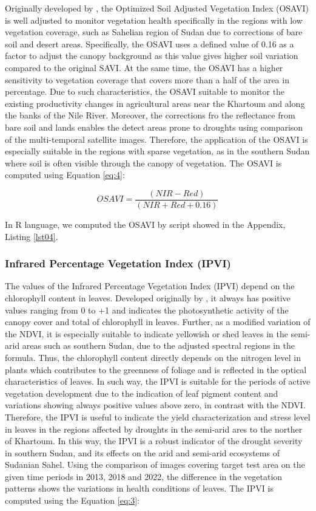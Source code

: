 \documentclass[jimaging,article,submit,pdftex,moreauthors]{Definitions/mdpi}
\begin{document}
Originally developed by \cite{Rondeaux}, the Optimized Soil Adjusted Vegetation Index (OSAVI) is well adjusted to monitor vegetation health specifically in the regions with low vegetation coverage, such as Sahelian region of Sudan due to corrections of bare soil and desert areas. Specifically, the OSAVI uses a defined value of 0.16 as a factor to adjust the canopy background as this value gives higher soil variation compared to the original SAVI. At the same time, the OSAVI has a higher sensitivity to vegetation coverage that covers more than a half of the area in percentage. Due to such characteristics, the OSAVI suitable to monitor the existing productivity changes in agricultural areas near the Khartoum and along the banks of the Nile River. Moreover, the corrections fro the reflectance from bare soil and lands enables the detect areas prone to droughts using comparison of the multi-temporal satellite images. Therefore, the application of the OSAVI is especially suitable in the regions with sparse vegetation, as in the southern Sudan where soil is often visible through the canopy of vegetation. The OSAVI is computed using Equation \ref{eq:4}:

\begin{equation}\label{eq:4}
	OSAVI=\dfrac{(NIR-Red)}{(NIR+Red+0.16)}
\end{equation}

In R language, we computed the OSAVI by script showed in the Appendix, Listing \ref{lst04}.

\subsubsection{Infrared Percentage Vegetation Index (IPVI)}

The values of the Infrared Percentage Vegetation Index (IPVI) depend on the chlorophyll content in leaves. Developed originally by \cite{CRIPPEN199071}, it always has positive values ranging from 0 to +1 and indicates the photosynthetic activity of the canopy cover and total of chlorophyll in leaves. Further, as a modified variation of the NDVI, it is especially suitable to indicate yellowish or shed leaves in the semi-arid areas such as southern Sudan, due to the adjusted spectral regions in the formula. Thus, the chlorophyll content directly depends on the nitrogen level in plants which contributes to the greenness of foliage and is reflected in the optical characteristics of leaves. In such way, the IPVI is suitable for the periods of active vegetation development due to the indication of leaf pigment content and variations showing always positive values above zero, in contrast with the NDVI. Therefore, the IPVI is useful to indicate the yield characterization and stress level in leaves in the regions affected by droughts in the semi-arid ares to the norther of Khartoum. In this way, the IPVI is a robust indicator of the drought severity in southern Sudan, and its effects on the arid and semi-arid ecosystems of Sudanian Sahel. Using the comparison of images covering target test area on the given time periods in 2013, 2018 and 2022, the difference in the vegetation patterns shows the variations in health conditions of leaves. The IPVI is computed using the Equation \ref{eq:3}:
\end{document}
